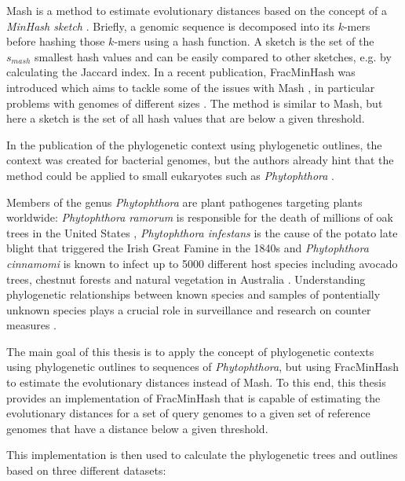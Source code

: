 Mash is a method to estimate evolutionary distances based on the concept of a
\textit{MinHash sketch}
\cite{broderResemblanceContainmentDocuments1998a,ondovMashFastGenome2016}.
Briefly, a genomic sequence is decomposed into its $k$-mers before hashing those
$k$-mers using a hash function. A sketch is the set of the $s_{mash}$ smallest
hash values and can be easily compared to other sketches, e.g. by calculating
the Jaccard index. In a recent publication, FracMinHash was introduced
which aims to tackle some of the issues with Mash
\cite{irberLightweightCompositionalAnalysis2022}, in particular problems with
genomes of different sizes
\cite{heraDebiasingFracMinHashDeriving2023,irberLightweightCompositionalAnalysis2022}.
The method is similar to Mash, but here a sketch is the set of all hash values
that are below a given threshold.

In the publication of the phylogenetic context using phylogenetic outlines, the
context was created for bacterial genomes, but the authors already
hint that the method could be applied to small eukaryotes such as
\textit{Phytophthora} \cite{bagciMicrobialPhylogeneticContext2021}.

Members of the genus \textit{Phytophthora} are plant pathogenes targeting plants
worldwide: \textit{Phytophthora ramorum} is responsible for the death of
millions of oak trees in the United States
\cite{cobbMagnitudeRegionalScaleTree2020}, \textit{Phytophthora infestans} is
the cause of the potato late blight that triggered the Irish Great Famine in the
1840s \cite{yoshidaRiseFallPhytophthora2013} and \textit{Phytophthora cinnamomi}
is known to infect up to 5000 different host species including avocado trees,
chestnut forests and natural vegetation in Australia
\cite{hardhamPhytophthoraCinnamomi2018}. Understanding phylogenetic
relationships between known species and samples of pontentially unknown species
plays a crucial role in surveillance and research on counter measures
\cite{piomboMetagenomicsApproachesDetection2021}.


The main goal of this thesis is to apply the concept of phylogenetic contexts
using phylogenetic outlines to sequences of \textit{Phytophthora}, but using
FracMinHash to estimate the evolutionary distances instead of Mash. To this end,
this thesis provides an implementation of FracMinHash that is capable of
estimating the evolutionary distances for a set of query genomes to a given set
of reference genomes that have a distance below a given threshold.

This implementation is then used to calculate the phylogenetic trees and
outlines based on three different datasets:

